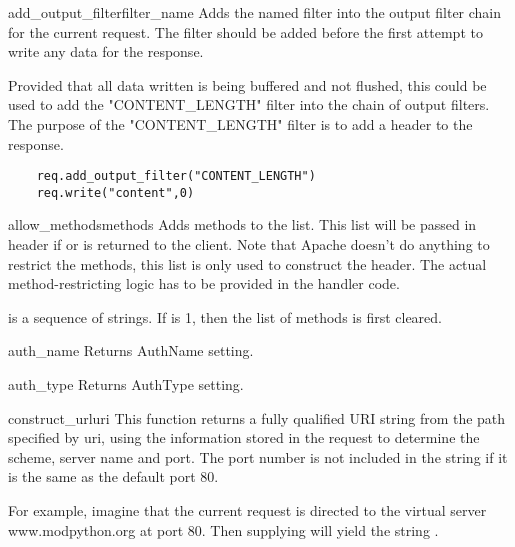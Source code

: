 \begin{methoddesc}[request]{add_output_filter}{filter_name}
  Adds the named filter into the output filter chain for the current request.
  The filter should be added before the first attempt to write any data for
  the response.

  Provided that all data written is being buffered and not flushed, this
  could be used to add the "CONTENT_LENGTH" filter into the chain of
  output filters. The purpose of the "CONTENT_LENGTH" filter is to add a
   header to the response.

  \begin{verbatim}
    req.add_output_filter("CONTENT_LENGTH")
    req.write("content",0)
  \end{verbatim}                              

\end{methoddesc}

\begin{methoddesc}[request]{allow_methods}{methods}
  Adds methods to the  list. This list
  will be passed in  header if
   or 
  is returned to the client. Note that Apache doesn't do anything to
  restrict the methods, this list is only used to construct the
  header. The actual method-restricting logic has to be provided in the
  handler code.

   is a sequence of strings. If  is 1, then
  the list of methods is first cleared.
\end{methoddesc}

\begin{methoddesc}[request]{auth_name}{}
  Returns AuthName setting.
\end{methoddesc}

\begin{methoddesc}[request]{auth_type}{}
  Returns AuthType setting.
\end{methoddesc}

\begin{methoddesc}[request]{construct_url}{uri}
  This function returns a fully qualified URI string from the path specified
  by uri, using the information stored in the request to determine the scheme,
  server name and port. The port number is not included in the string if it
  is the same as the default port 80.

  For example, imagine that the current request is directed to the virtual
  server www.modpython.org at port 80. Then supplying  will
  yield the string .

\end{methoddesc}

